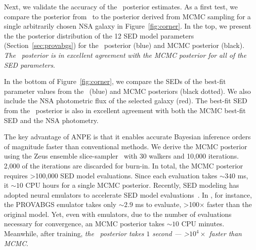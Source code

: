 Next, we validate the accuracy of the \sedflow~posterior estimates.
As a first test, we compare the posterior from \sedflow~to the posterior derived
from MCMC sampling for a single arbitrarily chosen NSA galaxy in
Figure~\ref{fig:corner}. 
In the top, we present the the posterior distribution of the 12 SED model
parameters (Section~\ref{sec:provabgs}) for the \sedflow~posterior (blue) and
MCMC posterior (black). 
\emph{The \sedflow~posterior is in excellent agreement with the MCMC posterior
for all of the SED parameters}. 
 
In the bottom of Figure~\ref{fig:corner}, we compare the SEDs of the best-fit
parameter values from the \sedflow~(blue) and MCMC posteriors (black dotted). 
We also include the NSA photometric flux of the selected galaxy (red). 
The best-fit SED from the \sedflow~posterior is also in excellent agreement
with both the MCMC best-fit SED and the NSA photometry.  

The key advantage of ANPE is that it enables accurate Bayesian inference
orders of magnitude faster than conventional methods. 
We derive the MCMC posterior using the {\sc Zeus} ensemble
slice-sampler~\citep{karamanis2020} with 30 walkers and 10,000 iterations.
2,000 of the iterations are discarded for burn-in. 
In total, the MCMC posterior requires >100,000 SED model evaluations. 
Since each evaluation takes ${\sim}340$ ms, it ${\sim}10$ CPU hours for
a single MCMC posterior. 
Recently, SED modeling has adopted neural emulators to accelerate SED model
evaluations~\citep{alsing2020}. 
In \cite{hahn2022}, for instance, the PROVABGS emulator takes
only ${\sim}2.9$ ms to evaluate, >100$\times$ faster than the original model. 
Yet, even with emulators, due to the number of evaluations necessary for
convergence, an MCMC posterior takes ${\sim}10$ CPU minutes. 
Meanwhile, after training, \emph{the \sedflow~posterior takes $1$ second ---
>$10^4\times$ faster than MCMC}. 

